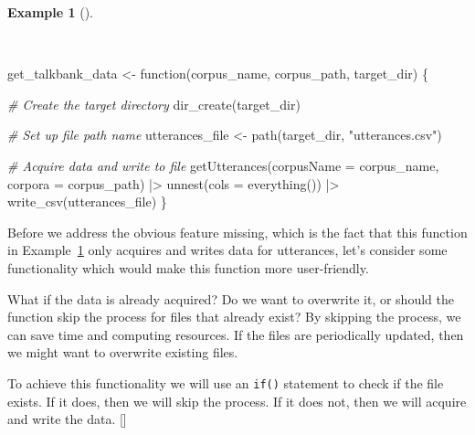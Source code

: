 \documentclass[
  letterpaper,
  krantz1]{latex/krantz-mod}
\newenvironment{Shaded}{\begin{snugshade}}{\end{snugshade}}
\newcommand{\AttributeTok}[1]{\textcolor[rgb]{0.00,0.00,0.00}{#1}}
\newcommand{\CommentTok}[1]{\textcolor[rgb]{0.00,0.00,0.00}{\textit{#1}}}
\newcommand{\ControlFlowTok}[1]{\textcolor[rgb]{0.00,0.00,0.00}{#1}}
\newcommand{\FunctionTok}[1]{\textcolor[rgb]{0.00,0.00,0.00}{#1}}
\newcommand{\NormalTok}[1]{\textcolor[rgb]{0.00,0.00,0.00}{#1}}
\newcommand{\OtherTok}[1]{\textcolor[rgb]{0.00,0.00,0.00}{#1}}
\newcommand{\SpecialCharTok}[1]{\textcolor[rgb]{0.00,0.00,0.00}{#1}}
\newcommand{\StringTok}[1]{\textcolor[rgb]{0.00,0.00,0.00}{#1}}
\newcommand{\cindex}[1]{%
  \StrSubstitute{#1}{_}{\_}[\temp]%
  \index{\temp}%
}
\theoremstyle{definition}
\theoremstyle{definition}
\newtheorem{example}{Example}[chapter]
\theoremstyle{remark}
\begin{document}
\begin{example}[]\protect\hypertarget{exm-acquire-get-talkbank-data-2}{}\label{exm-acquire-get-talkbank-data-2}

~

\begin{Shaded}
\begin{Highlighting}[numbers=left,,]
\NormalTok{get\_talkbank\_data }\OtherTok{\textless{}{-}} \ControlFlowTok{function}\NormalTok{(corpus\_name, corpus\_path, target\_dir) \{}

  \CommentTok{\# Create the target directory}
  \FunctionTok{dir\_create}\NormalTok{(target\_dir)}

  \CommentTok{\# Set up file path name}
\NormalTok{  utterances\_file  }\OtherTok{\textless{}{-}} \FunctionTok{path}\NormalTok{(target\_dir, }\StringTok{"utterances.csv"}\NormalTok{)}

  \CommentTok{\# Acquire data and write to file}
  \FunctionTok{getUtterances}\NormalTok{(}\AttributeTok{corpusName =}\NormalTok{ corpus\_name, }\AttributeTok{corpora =}\NormalTok{ corpus\_path) }\SpecialCharTok{|\textgreater{}}
    \FunctionTok{unnest}\NormalTok{(}\AttributeTok{cols =} \FunctionTok{everything}\NormalTok{()) }\SpecialCharTok{|\textgreater{}}
    \FunctionTok{write\_csv}\NormalTok{(utterances\_file)}
\NormalTok{\}}
\end{Highlighting}
\end{Shaded}

\end{example}

Before we address the obvious feature missing, which is the fact that
this function in Example~\ref{exm-acquire-get-talkbank-data-2} only
acquires and writes data for utterances, let's consider some
functionality which would make this function more user-friendly.

What if the data is already acquired? Do we want to overwrite it, or
should the function skip the process for files that already exist? By
skipping the process, we can save time and computing resources. If the
files are periodically updated, then we might want to overwrite existing
files.

To achieve this functionality we will use an \texttt{if()} statement to
check if the file exists. If it does, then we will skip the process. If
it does not, then we will acquire and write the
data.\cindex{if()}

\pagebreak
\end{document}
